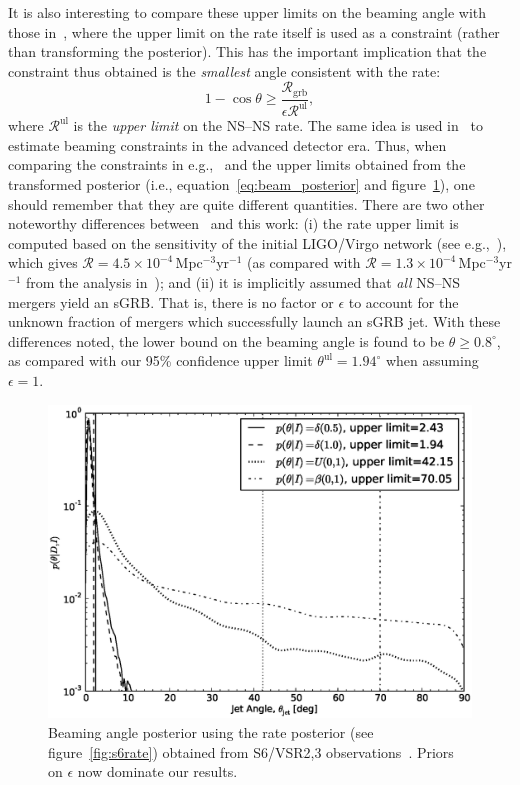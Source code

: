 \documentclass[twocolumn,nofootinbib]{revtex4-1}
\newcommand{\grbrate}{{{\mathcal R}_{\mathrm{grb}}}}
\newcommand{\cbcrate}{{{\mathcal R}}}
\newcommand{\BNS}{\ac{NS}--\ac{NS}\xspace}
\begin{document}
It is also interesting to compare these upper limits on the beaming angle with those in~\cite{2013PhRvL.111r1101C}, where the upper limit on the rate itself is used as a constraint (rather than transforming the posterior).
This has the important implication that the constraint thus obtained is the \emph{smallest} angle consistent with the rate:
%
\begin{equation}
    1 - \cos \theta \geq \frac{\grbrate}{\epsilon \cbcrate^{\mathrm{ul}}},
\end{equation}
%
where $\cbcrate^{\mathrm{ul}}$ is the \emph{upper limit} on the \BNS rate.
The same idea is used in~\cite{0004-637X-809-1-53} to estimate beaming constraints in the advanced detector era.
Thus, when comparing the constraints in e.g.,~\cite{2013PhRvL.111r1101C} and the upper limits obtained from the transformed posterior (i.e., equation~\ref{eq:beam_posterior} and figure~\ref{fig:s6angle}), one should remember that they are quite different quantities.
There are two other noteworthy differences between~\cite{2013PhRvL.111r1101C} and this work: (i) the rate upper limit is computed based on the sensitivity of the initial LIGO/Virgo network (see e.g.,~\cite{BradyFairhurst08}), which gives $\cbcrate=4.5\times 10^{-4}$\,Mpc$^{-3}$yr$^{-1}$ (as compared with $\cbcrate=1.3 \times 10^{-4}$\,Mpc$^{-3}$yr$^{-1}$ from the analysis in~\cite{S6lowmass}); and (ii) it is implicitly assumed that \emph{all} \BNS mergers yield an \ac{sGRB}.
That is, there is no factor or $\epsilon$ to account for the unknown fraction of mergers which successfully launch an \ac{sGRB} jet.
With these differences noted, the lower bound on the beaming angle is found to be $\theta \geq 0.8^{\circ}$, as compared with our 95\% confidence upper limit $\theta^{\mathrm{ul}}=1.94^{\circ}$ when assuming $\epsilon=1$.

\begin{figure}
\centering
\includegraphics[width=\linewidth]{jet_angle_posterior_iligo.eps}
\caption{Beaming angle posterior using the rate posterior (see figure~\ref{fig:s6rate}) obtained from S6/VSR2,3 observations~\cite{S6lowmass}.
    Priors on $\epsilon$ now dominate our results.
    \label{fig:s6angle}}
\end{figure}
\end{document}
